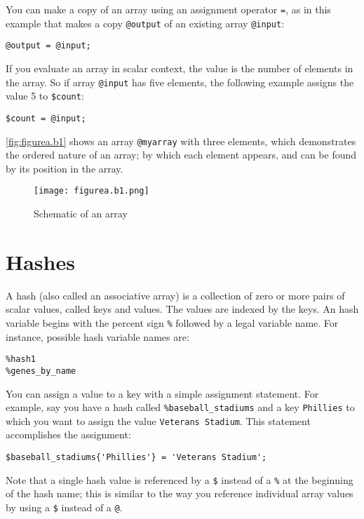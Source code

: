 You can make a copy of an array using an assignment operator \verb|=|, as in this example that makes a copy \verb|@output| of an existing array \verb|@input|: 

\begin{lstlisting}
@output = @input;
\end{lstlisting}

If you evaluate an array in scalar context, the value is the number of elements in the array. So if array \verb|@input| has five elements, the following example assigns the value 5 to \verb|$count|:

\begin{lstlisting}
$count = @input;
\end{lstlisting}

\autoref{fig:figurea.b1} shows an array \verb|@myarray| with three elements, which demonstrates the ordered nature of an array; by which each element appears, and can be found by its position in the array.

\begin{figure}
  \centering
  \texttt{[image: figurea.b1.png]}
  \caption{Schematic of an array}
  \label{fig:figurea.b1}
 \end{figure}{}

\section{Hashes}
A hash (also called an associative array) is a collection of zero or more pairs of scalar values, called keys and values. The values are indexed by the keys. An hash variable begins with the percent sign \verb|%| followed by a legal variable name. For instance, possible hash variable names are:

\begin{lstlisting}
%hash1
%genes_by_name
\end{lstlisting}

You can assign a value to a key with a simple assignment statement. For example, say you have a hash called \verb|%baseball_stadiums| and a key \verb|Phillies| to which you want to assign the value \verb|Veterans Stadium|. This statement accomplishes the assignment:

\begin{lstlisting}
$baseball_stadiums{'Phillies'} = 'Veterans Stadium';
\end{lstlisting}

Note that a single hash value is referenced by a \verb|$| instead of a \verb|%| at the beginning of the hash name; this is similar to the way you reference individual array values by using a \verb|$| instead of a \verb|@|.


